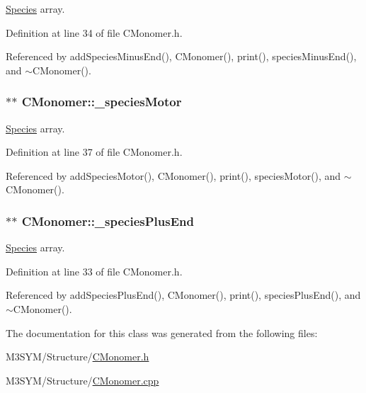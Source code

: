 \hyperlink{classSpecies}{Species} array. 



Definition at line 34 of file C\+Monomer.\+h.



Referenced by add\+Species\+Minus\+End(), C\+Monomer(), print(), species\+Minus\+End(), and $\sim$\+C\+Monomer().

\hypertarget{classCMonomer_af3b42603df2c3e4dff67457bad776fd6}{
\subsubsection[{\+\_\+species\+Motor}]{$\ast$$\ast$ C\+Monomer\+::\+\_\+species\+Motor\hspace{0.3cm}{\ttfamily [private]}}}\label{classCMonomer_af3b42603df2c3e4dff67457bad776fd6}


\hyperlink{classSpecies}{Species} array. 



Definition at line 37 of file C\+Monomer.\+h.



Referenced by add\+Species\+Motor(), C\+Monomer(), print(), species\+Motor(), and $\sim$\+C\+Monomer().

\hypertarget{classCMonomer_a536f3c948c52d79c73fe406048071e7b}{
\subsubsection[{\+\_\+species\+Plus\+End}]{$\ast$$\ast$ C\+Monomer\+::\+\_\+species\+Plus\+End\hspace{0.3cm}{\ttfamily [private]}}}\label{classCMonomer_a536f3c948c52d79c73fe406048071e7b}


\hyperlink{classSpecies}{Species} array. 



Definition at line 33 of file C\+Monomer.\+h.



Referenced by add\+Species\+Plus\+End(), C\+Monomer(), print(), species\+Plus\+End(), and $\sim$\+C\+Monomer().



The documentation for this class was generated from the following files\+:\begin{DoxyCompactItemize}
\item 
M3\+S\+Y\+M/\+Structure/\hyperlink{CMonomer_8h}{C\+Monomer.\+h}\item 
M3\+S\+Y\+M/\+Structure/\hyperlink{CMonomer_8cpp}{C\+Monomer.\+cpp}\end{DoxyCompactItemize}
